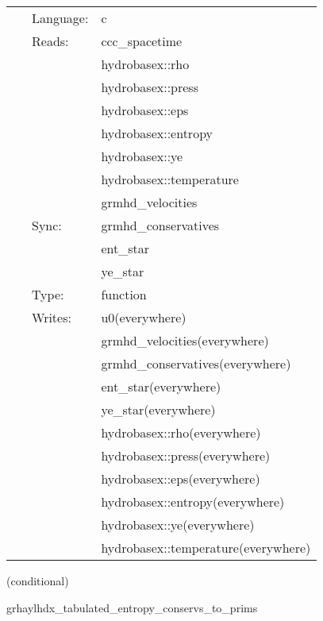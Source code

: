  \begin{tabular*}{160mm}{cll} 
~ & Language:  & c \\ 
~ & Reads:  & ccc\_spacetime \\ 
~& ~ &hydrobasex::rho\\ 
~& ~ &hydrobasex::press\\ 
~& ~ &hydrobasex::eps\\ 
~& ~ &hydrobasex::entropy\\ 
~& ~ &hydrobasex::ye\\ 
~& ~ &hydrobasex::temperature\\ 
~& ~ &grmhd\_velocities\\ 
~ & Sync:  & grmhd\_conservatives \\ 
~& ~ &ent\_star\\ 
~& ~ &ye\_star\\ 
~ & Type:  & function \\ 
~ & Writes:  & u0(everywhere) \\ 
~& ~ &grmhd\_velocities(everywhere)\\ 
~& ~ &grmhd\_conservatives(everywhere)\\ 
~& ~ &ent\_star(everywhere)\\ 
~& ~ &ye\_star(everywhere)\\ 
~& ~ &hydrobasex::rho(everywhere)\\ 
~& ~ &hydrobasex::press(everywhere)\\ 
~& ~ &hydrobasex::eps(everywhere)\\ 
~& ~ &hydrobasex::entropy(everywhere)\\ 
~& ~ &hydrobasex::ye(everywhere)\\ 
~& ~ &hydrobasex::temperature(everywhere)\\ 
\end{tabular*} 


\vspace{5mm}

   (conditional) 

\hspace{5mm} grhaylhdx\_tabulated\_entropy\_conservs\_to\_prims 

\hspace{5mm}{\it entropy+tabulated version of grhaylhdx\_conservs\_to\_prims } 


\hspace{5mm}

